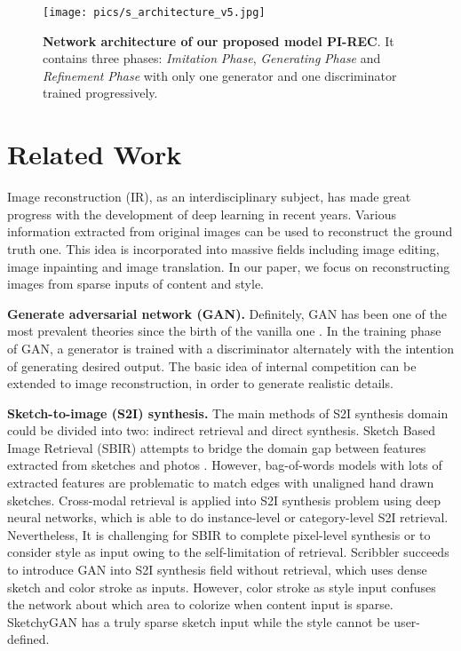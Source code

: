 \documentclass[10pt,twocolumn,letterpaper]{article} \usepackage{amsfonts,amssymb}
\begin{document}
\begin{figure*}[t]
\centering



\texttt{[image: pics/s\_architecture\_v5.jpg]}

\caption{\textbf{Network architecture of our proposed model PI-REC}. It contains three phases: \emph{Imitation} \emph{Phase}, \emph{Generating} \emph{Phase} and \emph{Refinement} \emph{Phase} with only one generator and one discriminator trained progressively.}
\label{Network}
\end{figure*}

\section{Related Work} \label{Related Work}
Image reconstruction (IR), as an interdisciplinary subject, has made great progress with the development of deep learning in recent years. Various information extracted from original images can be used to reconstruct the ground truth one. This idea is incorporated into massive fields including image editing, image inpainting and image translation. In our paper, we focus on reconstructing images from sparse inputs of content and style.

{\bf Generate adversarial network (GAN).} Definitely, GAN has been one of the most prevalent theories since the birth of the vanilla one \cite{goodfellow2014generative}. In the training phase of GAN, a generator is trained with a discriminator alternately with the intention of generating desired output. The basic idea of internal competition can be extended to image reconstruction, in order to generate realistic details.

{\bf Sketch-to-image (S2I) synthesis.} The main methods of S2I synthesis domain could be divided into two: indirect retrieval and direct synthesis. Sketch Based Image Retrieval (SBIR) attempts to bridge the domain gap between features extracted from sketches and photos \cite{cao2011edgel,cao2010mindfinder,eitz2010evaluation,eitz2011sketch}. However, bag-of-words models with lots of extracted features \cite{mao2019mode} are problematic to match edges with unaligned hand drawn sketches. Cross-modal retrieval is applied into S2I synthesis problem using deep neural networks, which is able to do instance-level \cite{yu2016sketch,sangkloy2016sketchy} or category-level \cite{srivastava2017veegan,che2016mode} S2I retrieval. Nevertheless, It is challenging for SBIR to complete pixel-level synthesis or to consider style as input owing to the self-limitation of retrieval. Scribbler \cite{sangkloy2017scribbler} succeeds to introduce GAN into S2I synthesis field without retrieval, which uses dense sketch and color stroke as inputs. However, color stroke as style input confuses the network about which
area to colorize when content input is sparse. SketchyGAN \cite{chen2018sketchygan} has a truly sparse sketch input while the style cannot be user-defined.
\end{document}
